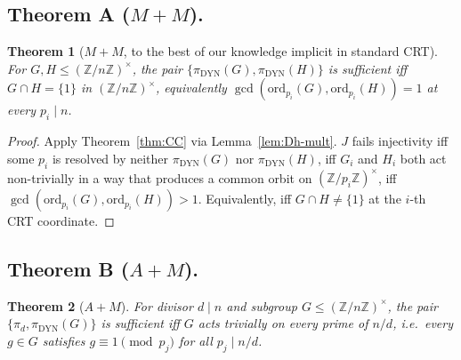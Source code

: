 \documentclass[11pt,reqno]{amsart}
\theoremstyle{plain}
\newtheorem{theorem}{Theorem}
\theoremstyle{definition}
\newcommand{\Z}{\mathbb{Z}}
\newcommand{\Zns}{(\Z/n\Z)^{\times}}
\newcommand{\DYN}{\mathrm{DYN}}
\newcommand{\ord}{\mathrm{ord}}
\begin{document}
\subsection{Theorem A ($M{+}M$).} \label{ssec:A}

\begin{theorem}[$M{+}M$, to the best of our knowledge implicit in standard CRT] \label{thm:A}
For $G, H \leq \Zns$, the pair $\{\pi_{\DYN}(G), \pi_{\DYN}(H)\}$ is
sufficient iff $G \cap H = \{1\}$ in $\Zns$, equivalently
$\gcd(\ord_{p_i}(G), \ord_{p_i}(H)) = 1$ at every $p_i \mid n$.
\end{theorem}

\begin{proof}
Apply Theorem~\ref{thm:CC} via Lemma~\ref{lem:Dh-mult}. $J$ fails
injectivity iff some $p_i$ is resolved by neither $\pi_{\DYN}(G)$ nor
$\pi_{\DYN}(H)$, iff $G_i$ and $H_i$ both act non-trivially in a way
that produces a common orbit on $(\Z/p_i\Z)^{\times}$, iff
$\gcd(\ord_{p_i}(G), \ord_{p_i}(H)) > 1$. Equivalently, iff
$G \cap H \neq \{1\}$ at the $i$-th CRT coordinate.
\end{proof}

\subsection{Theorem B ($A{+}M$).} \label{ssec:B}

\begin{theorem}[$A{+}M$] \label{thm:B}
For divisor $d \mid n$ and subgroup $G \leq \Zns$, the pair
$\{\pi_d, \pi_{\DYN}(G)\}$ is sufficient iff $G$ acts trivially on
every prime of $n/d$, i.e.\ every $g \in G$ satisfies $g \equiv 1
\pmod{p_j}$ for all $p_j \mid n/d$.
\end{theorem}
\end{document}
